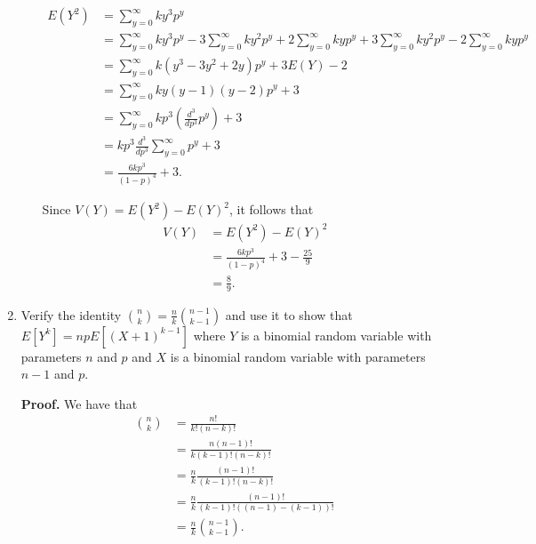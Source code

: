 \documentclass[9pt]{article}
\newcommand{\D}{\displaystyle}
\begin{document}
\begin{enumerate}
\begin{enumerate}
\begin{align*}
                  E(Y^2) &= \sum_{y=0}^\infty ky^3p^y \\
                       &= \sum_{y=0}^\infty ky^3p^y - 3\sum_{y=0}^\infty ky^2p^y
                          + 2\sum_{y=0}^\infty kyp^y
                          + 3\sum_{y=0}^\infty ky^2p^y
                          - 2\sum_{y=0}^\infty kyp^y   \\
                       &= \sum_{y=0}^\infty k(y^3-3y^2+2y)p^y + 3E(Y) - 2 \\
                       &= \sum_{y=0}^\infty ky(y-1)(y-2)p^y + 3 \\
                       &= \sum_{y=0}^\infty kp^3\left(\frac{d^3}{dp^3}p^y\right)
                          + 3 \\
                       &= kp^3\frac{d^3}{dp^3}\sum_{y=0}^\infty p^y + 3 \\
                       &= \frac{6kp^3}{(1 - p)^4} + 3.
               \end{align*}
               
               Since $V(Y) = E(Y^2) - E(Y)^2$, it follows that
               \begin{align*}
                  V(Y) &= E(Y^2) - E(Y)^2 \\
                       &= \frac{6kp^3}{(1 - p)^4} + 3 - \frac{25}{9} \\
                       &= \frac{8}{9}.
               \end{align*}
      \end{enumerate}
   \item Verify the identity $\D\binom{n}{k} = \frac{n}{k}\binom{n-1}{k-1}$ and
         use it to show that $E[Y^k] = npE[(X+1)^{k-1}]$ where $Y$ is a binomial
         random variable with parameters $n$ and $p$ and $X$ is a binomial
         random variable with parameters $n - 1$ and $p$.

      \textbf{Proof.} We have that
      \begin{align*}
         \binom{n}{k} &= \frac{n!}{k!(n - k)!} \\
            &= \frac{n(n - 1)!}{k(k - 1)!(n - k)!} \\
            &= \frac{n}{k}\frac{(n - 1)!}{(k - 1)!(n - k)!} \\
            &= \frac{n}{k}\frac{(n - 1)!}{(k - 1)!((n - 1) - (k - 1))!} \\
            &= \frac{n}{k}\binom{n - 1}{k - 1}.
      \end{align*}


\end{enumerate}
\end{document}
